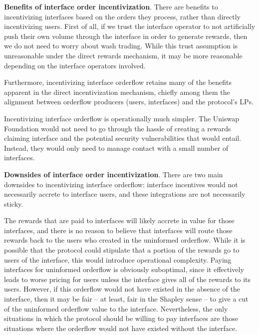         \textbf{Benefits of interface order incentivization}.
        There are benefits to incentivizing interfaces based on the orders they process, rather than directly incentivizing users. First of all, if we trust the interface operator to not artificially push their own volume through the interface in order to generate rewards, then we do not need to worry about wash trading. While this trust assumption is unreasonable under the direct rewards mechanism, it may be more reasonable depending on the interface operators involved. %

        Furthermore, incentivizing interface orderflow retains many of the benefits apparent in the direct incentivization mechanism, chiefly among them the alignment between orderflow producers (users, interfaces) and the protocol's LPs.

        Incentivizing interface orderflow is operationally much simpler. The Uniswap Foundation would not need to go through the hassle of creating a rewards claiming interface and the potential security vulnerabilities that would entail. Instead, they would only need to manage contact with a small number of interfaces.


        \textbf{Downsides of interface order incentivization}.
        There are two main downsides to incentivizing interface orderflow: interface incentives would not necessarily accrete to interface users, and these integrations are not necessarily sticky.

        The rewards that are paid to interfaces will likely accrete in value for those interfaces, and there is no reason to believe that interfaces will route those rewards back to the users who created in the uninformed orderflow. While it is possible that the protocol could stipulate that a portion of the rewards go to users of the interface, this would introduce operational complexity. Paying interfaces for uninformed orderflow is obviously suboptimal, since it effectively leads to worse pricing for users unless the interface gives all of the rewards to its users. However, if this orderflow would not have existed in the absence of the interface, then it may be fair -- at least, fair in the Shapley sense \cite{shapley1997value} -- to give a cut of the uninformed orderflow value to the interface. Nevertheless, the only situations in which the protocol should be willing to pay interfaces are those situations where the orderflow would not have existed without the interface.

